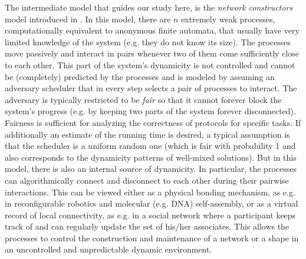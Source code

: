 \documentclass[preprint]{elsarticle}
\begin{document}
The intermediate model that guides our study here, is the \emph{network constructors} model introduced in \cite{MS14}. In this model, there are $n$ extremely weak processes, computationally equivalent to anonymous finite automata, that usually have very limited knowledge of the system (e.g. they do not know its size). The processes move passively and interact in pairs whenever two of them come sufficiently close to each other. This part of the system's dynamicity is not controlled and cannot be (completely) predicted by the processes and is modeled by assuming an adversary scheduler that in every step selects a pair of processes to interact. The adversary is typically restricted to be \emph{fair} so that it cannot forever block the system's progress (e.g. by keeping two parts of the system forever disconnected). Fairness is sufficient for analyzing the correctness of protocols for specific tasks. If additionally an estimate of the running time is desired, a typical assumption is that the scheduler is a uniform random one (which is fair with probability 1 \cite{CDFMS09} and also corresponds to the dynamicity patterns of well-mixed solutions). But in this model, there is also an internal source of dynamicity. In particular, the processes can algorithmically connect and disconnect to each other during their pairwise interactions. This can be viewed either as a physical bonding mechanism, as e.g. in reconfigurable robotics and molecular (e.g. DNA) self-assembly, or as a virtual record of local connectivity, as e.g. in a social network where a participant keeps track of and can regularly update the set of his/her associates. This allows the processes to control the construction and maintenance of a network or a shape in an uncontrolled and unpredictable dynamic environment. 
\end{document}
